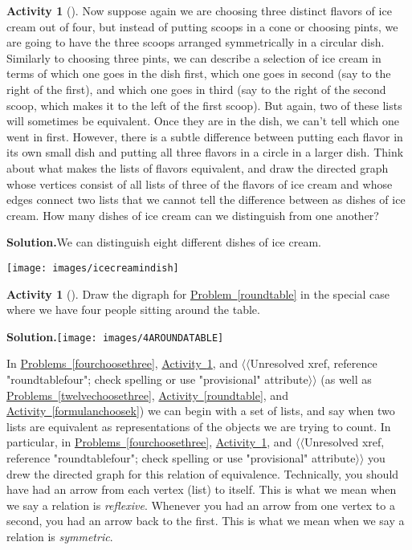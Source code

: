 \documentclass[10pt,]{book}
\theoremstyle{plain}
\theoremstyle{definition}
\newtheorem{activity}[project]{Activity}
\numberwithin{equation}{chapter}
\begin{document}
\begin{activity}[]\label{icecreaminadish}
Now suppose again we are choosing three distinct flavors of ice cream out of four, but instead of putting scoops in a cone or choosing pints, we are going to have the three scoops arranged symmetrically in a circular dish. Similarly to choosing three pints, we can describe a selection of ice cream in terms of which one goes in the dish first, which one goes in second (say to the right of the first), and which one goes in third (say to the right of the second scoop, which makes it to the left of the first scoop). But again, two of these lists will sometimes be equivalent. Once they are in the dish, we can't tell which one went in first. However, there is a subtle difference between putting each flavor in its own small dish and putting all three flavors in a circle in a larger dish. Think about what makes the lists of flavors equivalent, and draw the directed graph whose vertices consist of all lists of three of the flavors of ice cream and whose edges connect two lists that we cannot tell the difference between as dishes of ice cream. How many dishes of ice cream can we distinguish from one another?%
\par\medskip\noindent%
\textbf{Solution.}\quad We can distinguish eight different dishes of ice cream.%
\par
\texttt{[image: images/icecreamindish]}
%
\end{activity}
\begin{activity}[]\label{activity-339}
Draw the digraph for \hyperref[roundtable]{Problem~\ref{roundtable}} in the special case where we have four people sitting around the table.%
\par\medskip\noindent%
\textbf{Solution.}\quad \texttt{[image: images/4AROUNDATABLE]}
\end{activity}
In \hyperref[fourchoosethree]{Problems~\ref{fourchoosethree}}, \hyperref[icecreaminadish]{Activity~\ref{icecreaminadish}}, and {$\langle\langle$Unresolved xref, reference "roundtablefour"; check spelling or use "provisional" attribute$\rangle\rangle$} (as well as \hyperref[twelvechoosethree]{Problems~\ref{twelvechoosethree}}, \hyperref[roundtable]{Activity~\ref{roundtable}}, and \hyperref[formulanchoosek]{Activity~\ref{formulanchoosek}}) we can begin with a set of lists, and say when two lists are equivalent as representations of the objects we are trying to count. In particular, in \hyperref[fourchoosethree]{Problems~\ref{fourchoosethree}}, \hyperref[icecreaminadish]{Activity~\ref{icecreaminadish}}, and {$\langle\langle$Unresolved xref, reference "roundtablefour"; check spelling or use "provisional" attribute$\rangle\rangle$} you drew the directed graph for this relation of equivalence. Technically, you should have had an arrow from each vertex (list) to itself. This is what we mean when we say a relation is \emph{reflexive}. Whenever you had an arrow from one vertex to a second, you had an arrow back to the first. This is what we mean when we say a relation is \emph{symmetric}.%
\end{document}

